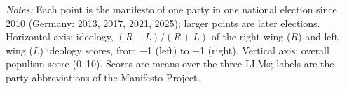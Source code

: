 \par\smallskip\begin{minipage}{\linewidth}\scriptsize\textit{Notes:} Each point is the manifesto of one party in one national election since 2010 (Germany: 2013, 2017, 2021, 2025); larger points are later elections. Horizontal axis: ideology, $(R-L)/(R+L)$ of the right-wing ($R$) and left-wing ($L$) ideology scores, from $-$1 (left) to +1 (right). Vertical axis: overall populism score (0--10). Scores are means over the three LLMs; labels are the party abbreviations of the Manifesto Project.\end{minipage}

